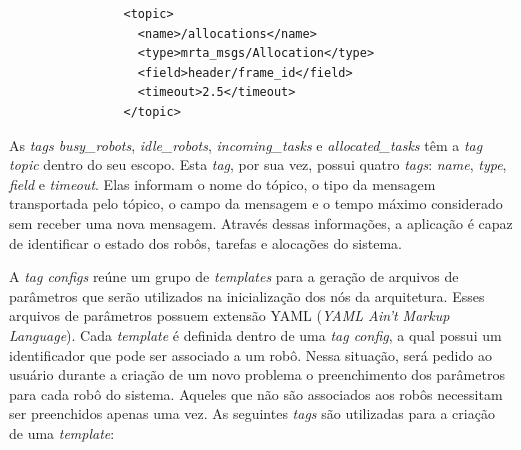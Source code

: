             \begin{lstlisting}
                <topic>
                  <name>/allocations</name>
                  <type>mrta_msgs/Allocation</type>
                  <field>header/frame_id</field>
                  <timeout>2.5</timeout>
                </topic>
            \end{lstlisting}
            
            As \textit{tags busy\_robots}, \textit{idle\_robots}, \textit{incoming\_tasks} e \textit{allocated\_tasks} têm a \textit{tag topic} dentro do seu escopo. Esta \textit{tag}, por sua vez, possui quatro \textit{tags}: \textit{name}, \textit{type}, \textit{field} e \textit{timeout}. Elas informam o nome do tópico, o tipo da mensagem transportada pelo tópico, o campo da mensagem e o tempo máximo considerado sem receber uma nova mensagem. Através dessas informações, a aplicação é capaz de identificar o estado dos robôs, tarefas e alocações do sistema.
            
            A \textit{tag configs} reúne um grupo de \textit{templates} para a geração de arquivos de parâmetros que serão utilizados na inicialização dos nós da arquitetura. Esses arquivos de parâmetros possuem extensão YAML (\textit{YAML Ain't Markup Language}). Cada \textit{template} é definida dentro de uma \textit{tag config}, a qual possui um identificador que pode ser associado a um robô. Nessa situação, será pedido ao usuário durante a criação de um novo problema o preenchimento dos parâmetros para cada robô do sistema. Aqueles que não são associados aos robôs necessitam ser preenchidos apenas uma vez. As seguintes \textit{tags} são utilizadas para a criação de uma \textit{template}:
            
